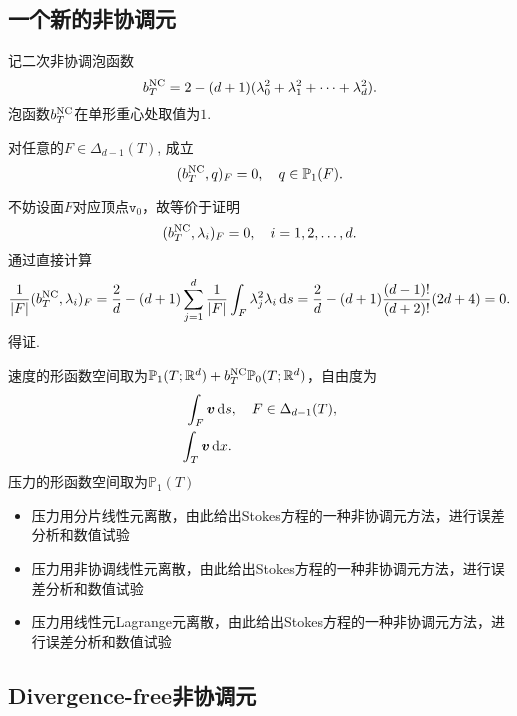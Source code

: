 \subsection{一个新的非协调元}

记二次非协调泡函数
\begin{equation*}
b_{T}^{\rm NC}=2-(d+1)(\lambda_0^2+\lambda_1^2+\cdots+\lambda_d^2).
\end{equation*}
泡函数$b_{T}^{\rm NC}$在单形重心处取值为$1$.

\begin{lemma}
对任意的$F\in\Delta_{d-1}(T)$,
成立
\begin{equation*}
(b_{T}^{\rm NC}, q)_F=0,\quad q\in \mathbb P_1(F).
\end{equation*}
\end{lemma}
\begin{prf}
不妨设面$F$对应顶点$\texttt{v}_0$，故等价于证明 %
\begin{equation*}
(b_{T}^{\rm NC}, \lambda_i)_F=0,\quad i=1,2,\ldots, d.
\end{equation*}
通过直接计算
\begin{equation*}
\frac{1}{|F|}(b_{T}^{\rm NC}, \lambda_i)_F=\frac{2}{d}-(d+1)\sum_{j=1}^d\frac{1}{|F|}\int_F\lambda_j^2\lambda_i\,{\rm d} s=\frac{2}{d}-(d+1)\frac{(d-1)!}{(d+2)!}(2d+4)=0.
\end{equation*}
得证.
\end{prf}

速度的形函数空间取为$\mathbb P_1(T;\mathbb R^d)+b_{T}^{\rm NC}\mathbb P_0(T;\mathbb R^d)$，自由度为
\begin{align*}
\int_F\boldsymbol{v}\,{\rm d} s&, \quad F\in\Delta_{d-1}(T),\\
\int_T\boldsymbol{v}\,{\rm d}x.&
\end{align*}
压力的形函数空间取为$\mathbb P_1(T)$

\begin{itemize}
\item 压力用分片线性元离散，由此给出Stokes方程的一种非协调元方法，进行误差分析和数值试验
\item 压力用非协调线性元离散，由此给出Stokes方程的一种非协调元方法，进行误差分析和数值试验
\item 压力用线性元Lagrange元离散，由此给出Stokes方程的一种非协调元方法，进行误差分析和数值试验
\end{itemize}



\subsection{Divergence-free非协调元}

